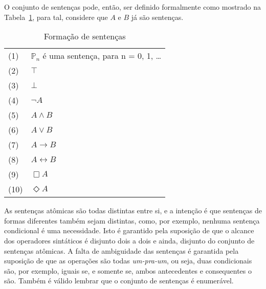 O conjunto de sentenças pode, então, ser definido formalmente como mostrado na
Tabela~\ref{table:sentences}, para tal, considere que $A$ e $B$ já são
sentenças.

\begin{center}
    \begin{table}[h!]
\label{table:sentences}
\caption{Formação de sentenças}

    \begin{tabular}{ll}
        \vspace{2mm}
        (1) & $\mathbb{P}_n$ é uma sentença, para n = 0, 1, \ldots\\
        \vspace{2mm}
        (2)  & $\top$\\
        \vspace{2mm}
        (3)  & $\bot$\\
        \vspace{2mm}
        (4)  & $\neg A$\\
        \vspace{2mm}
        (5)  & $A \wedge B$\\
        \vspace{2mm}
        (6)  & $A \vee B$\\
        \vspace{2mm}
        (7)  & $A \rightarrow B$\\
        \vspace{2mm}
        (8)  & $A \leftrightarrow B$\\
        \vspace{2mm}
        (9)  & $\Box A$\\
        \vspace{2mm}
        (10) &$\Diamond A$
    \end{tabular}
\end{table}
\end{center}

As sentenças at\^omicas são todas distintas entre si, e a intenção é que sentenças
de formas diferentes também sejam distintas, como, por exemplo, nenhuma sentença
condicional é uma necessidade. Isto é garantido pela suposição de que o alcance
dos operadores sintáticos é disjunto dois a dois e ainda, disjunto do conjunto
de sentenças at\^omicas.
A falta de ambiguidade das sentenças é garantida pela suposição de que as
operações são todas \textit{um-pra-um}, ou seja, duas condicionais são, por
exemplo, iguais se, e somente se, ambos antecedentes e consequentes o são.
Também é válido lembrar que o conjunto de sentenças é enumerável.


